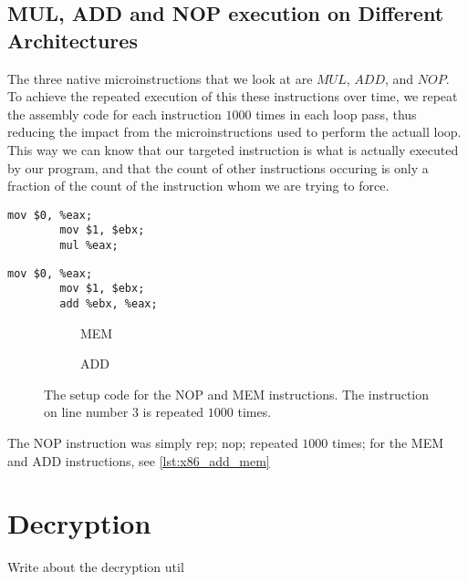 \subsection{MUL, ADD and NOP execution on Different Architectures}

The three native microinstructions that we look at are \(MUL\), \(ADD\), and \(NOP\). 
To achieve the repeated execution of this these instructions over time, we repeat the assembly code for each instruction \(1000\) times in each loop pass, thus reducing the impact from the microinstructions used to perform the actuall loop. 
This way we can know that our targeted instruction is what is actually executed by our program, and that the count of other instructions occuring is only a fraction of the count of the instruction whom we are trying to force.

\newsavebox{\MEMfigure}
	\begin{lrbox}{\MEMfigure}%
	\begin{lstlisting}[language={[x86masm]Assembler}]
		mov $0, %eax;
		mov $1, $ebx;
		mul %eax;
	\end{lstlisting}
\end{lrbox}

\newsavebox{\ADDfigure}
	\begin{lrbox}{\ADDfigure}%
	\begin{lstlisting}[language={[x86masm]Assembler}]
		mov $0, %eax;
		mov $1, $ebx;
		add %ebx, %eax;
	\end{lstlisting}
\end{lrbox}

\begin{figure}[h]
    \begin{subfigure}{0.5\textwidth}
        \centering
        \usebox{\MEMfigure}
        \caption{MEM}
    \end{subfigure}
    \begin{subfigure}{0.5\textwidth}
        \centering
        \usebox{\ADDfigure}
        \caption{ADD}
    \end{subfigure}
	\caption{The setup code for the NOP and MEM instructions. The instruction on line number 3 is repeated \(1000\) times.}
	\label{lst:x86_add_mem}
\end{figure}

The NOP instruction was simply rep; nop; repeated \(1000\) times; for the MEM and ADD instructions, see \autoref{lst:x86_add_mem} 

\section{Decryption}
Write about the decryption util

